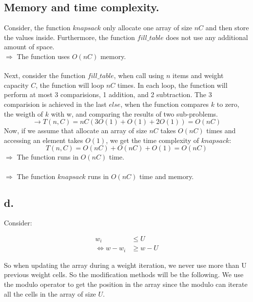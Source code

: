 \documentclass{article}
\begin{document}
\subsection*{Memory and time complexity.}
Consider, the function $knapsack$ only allocate one array of size $nC$ and then store the values inside. Furthermore, the function $fill\_table$ does not use any additional amount of space. \\
$\Rightarrow$ The function uses $O(nC)$ memory. \\\\
Next, consider the function $fill\_table$, when call using $n$ items and weight capacity $C$, the function will loop $nC$ times. In each loop, the function will perform at most 3 comparisions, 1 addition, and 2 subtraction. The 3 comparision is achieved in the last $else$, when the function compares $k$ to zero, the weigth of $k$ with w, and comparing the results of two sub-problems.\\
\[
\rightarrow T(n, C) = nC(3O(1) + O(1) + 2O(1)) = O(nC)
\]
Now, if we assume that allocate an array of size $nC$ takes $O(nC)$ times and accessing an element takes $O(1)$, we get the time complexity of $knapsack$:
\[
T(n, C) = O(nC) + O(nC) + O(1) = O(nC)
\]
$\Rightarrow$ The function runs in $O(nC)$ time. \\\\

$\Longrightarrow$ The function $knapsack$ runs in $O(nC)$ time and memory.


\pagebreak
\subsection*{d.}
Consider:

\begin{align}
                             w_i &\leq U         \nonumber \\ 
\Leftrightarrow w - w_i &\geq w - U  \nonumber
\end{align}

So when updating the array during a weight iteration, we never use more than U previous weight cells. So the modification methods will be the following. We use the modulo operator to get the position in the array since the modulo can iterate all the cells in the array of size $U$.

\begin{algorithm}
\caption{$fill\_table(n, C, U, arr)$}\label{alg:cap}
\begin{algorithmic}
        \Else
        \EndIf
    \EndFor
\EndFor
\end{algorithmic}
\end{algorithm}
\end{document}
